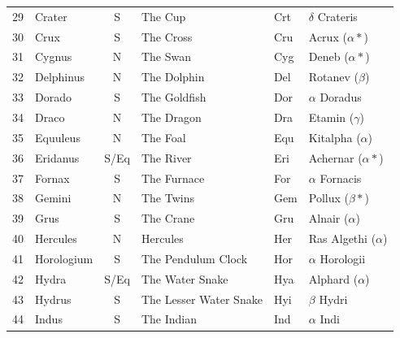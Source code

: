 \documentclass[a4paper,12pt]{extarticle}
\begin{document}
\begin{table}[H]
\begin{tabular}{llclll}
29 & Crater          & S    & The Cup                & Crt & $\delta$ Crateris                  \\
30 & Crux            & S    & The Cross              & Cru & Acrux ($\alpha \ast$)              \\
31 & Cygnus          & N    & The Swan               & Cyg & Deneb ($\alpha \ast$)              \\
32 & Delphinus       & N    & The Dolphin            & Del & Rotanev ($\beta$)                  \\
33 & Dorado          & S    & The Goldfish           & Dor & $\alpha$ Doradus                   \\
34 & Draco           & N    & The Dragon             & Dra & Etamin ($\gamma$)                  \\
35 & Equuleus        & N    & The Foal               & Equ & Kitalpha ($\alpha$) \\
36 & Eridanus        & S/Eq & The River              & Eri & Achernar ($\alpha \ast$)           \\
37 & Fornax          & S    & The Furnace            & For & $\alpha$ Fornacis                  \\
38 & Gemini          & N    & The Twins              & Gem & Pollux ($\beta \ast$)              \\
39 & Grus            & S    & The Crane              & Gru & Alnair ($\alpha$)                  \\
40 & Hercules        & N    & Hercules               & Her & Ras Algethi ($\alpha$)             \\
41 & Horologium      & S    & The Pendulum Clock     & Hor & $\alpha$ Horologii                 \\
42 & Hydra           & S/Eq & The Water Snake        & Hya & Alphard ($\alpha$)                 \\
43 & Hydrus          & S    & The Lesser Water Snake & Hyi & $\beta$ Hydri                      \\
44 & Indus           & S    & The Indian             & Ind & $\alpha$ Indi      
\end{tabular}
\end{table}

\clearpage
\end{document}
